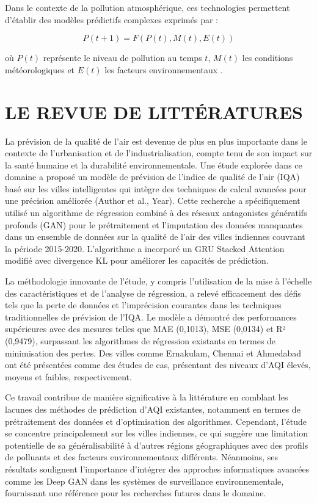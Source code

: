 \documentclass[12pt,a4paper]{report}
\begin{document}
Dans le contexte de la pollution atmosphérique, ces technologies permettent d'établir des modèles prédictifs complexes exprimés par :

\begin{equation}
    P(t+1) = F(P(t), M(t), E(t))
\end{equation}

où $P(t)$ représente le niveau de pollution au temps $t$, $M(t)$ les conditions météorologiques et $E(t)$ les facteurs environnementaux \cite{Zhang2020}.



\chapter{LE REVUE DE LITTÉRATURES}
La prévision de la qualité de l'air est devenue de plus en plus importante dans le contexte de l'urbanisation et de l'industrialisation, compte tenu de son impact sur la santé humaine et la durabilité environnementale. Une étude explorée dans ce domaine a proposé un modèle de prévision de l'indice de qualité de l'air (IQA) basé sur les villes intelligentes qui intègre des techniques de calcul avancées pour une précision améliorée (Author et al., Year). Cette recherche a spécifiquement utilisé un algorithme de régression combiné à des réseaux antagonistes génératifs profonds (GAN) pour le prétraitement et l'imputation des données manquantes dans un ensemble de données sur la qualité de l'air des villes indiennes couvrant la période 2015-2020. L'algorithme a incorporé un GRU Stacked Attention modifié avec divergence KL pour améliorer les capacités de prédiction.

La méthodologie innovante de l'étude, y compris l'utilisation de la mise à l'échelle des caractéristiques et de l'analyse de régression, a relevé efficacement des défis tels que la perte de données et l'imprécision courantes dans les techniques traditionnelles de prévision de l'IQA. Le modèle a démontré des performances supérieures avec des mesures telles que MAE (0,1013), MSE (0,0134) et R² (0,9479), surpassant les algorithmes de régression existants en termes de minimisation des pertes. Des villes comme Ernakulam, Chennai et Ahmedabad ont été présentées comme des études de cas, présentant des niveaux d'AQI élevés, moyens et faibles, respectivement.

Ce travail contribue de manière significative à la littérature en comblant les lacunes des méthodes de prédiction d'AQI existantes, notamment en termes de prétraitement des données et d'optimisation des algorithmes. Cependant, l'étude se concentre principalement sur les villes indiennes, ce qui suggère une limitation potentielle de sa généralisabilité à d'autres régions géographiques avec des profils de polluants et des facteurs environnementaux différents. Néanmoins, ses résultats soulignent l'importance d'intégrer des approches informatiques avancées comme les Deep GAN dans les systèmes de surveillance environnementale, fournissant une référence pour les recherches futures dans le domaine.
\end{document}
